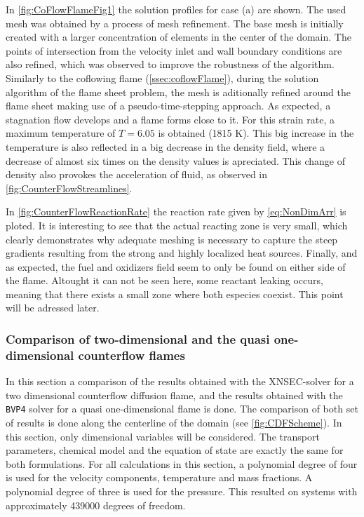 In \cref{fig:CoFlowFlameFig1} the solution profiles for case (a) are shown. The used mesh was obtained by a process of mesh refinement. The base mesh is initially created with a larger concentration of elements in the center of the domain. The points of intersection from the velocity inlet and wall boundary conditions are also refined, which was observed to improve the robustness of the algorithm. Similarly to the coflowing flame (\cref{ssec:coflowFlame}), during the solution algorithm of the flame sheet problem, the mesh is aditionally refined around the flame sheet making use of a pseudo-time-stepping approach.
As expected, a stagnation flow develops and a flame forms close to it. For this strain rate, a maximum temperature of $T = 6.05$ is obtained (1815 $\si{\kelvin}$). This big increase in the temperature is also reflected in a big decrease in the density field, where a decrease of almost six times on the density values is apreciated. This change of density also provokes the acceleration of fluid, as observed in \cref{fig:CounterFlowStreamlines}. 

In \cref{fig:CounterFlowReactionRate} the reaction rate given by \cref{eq:NonDimArr} is ploted. It is interesting to see that the actual reacting zone is very small, which clearly demonstrates why adequate meshing is necessary to capture the steep gradients resulting from the strong and highly localized heat sources. Finally, and as expected, the fuel and oxidizers field seem to only be found on either side of the flame. Altought it can not be seen here, some reactant leaking occurs, meaning that there exists a small zone where both especies coexist. This point will be adressed later. 


\subsubsection{Comparison of two-dimensional and the quasi one-dimensional counterflow flames}
In this section a comparison of the results obtained with the XNSEC-solver for a two dimensional counterflow diffusion flame, and the results obtained with the \lstinline|BVP4| solver for a quasi one-dimensional flame is done. The comparison of both set of results is done along the centerline of the domain (see \cref{fig:CDFScheme}). In this section, only dimensional variables will be considered. The transport parameters, chemical model and the equation of state are exactly the same for both formulations. For all calculations in this section, a polynomial degree of four is used for the velocity components, temperature and mass fractions. A polynomial degree of three is used for the pressure. This resulted on systems with approximately 439000 degrees of freedom. 
 
